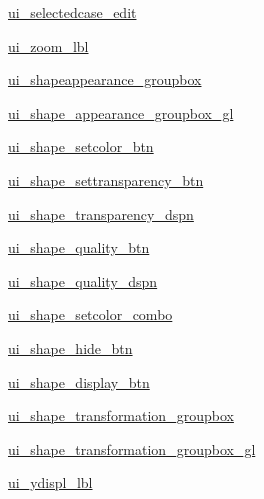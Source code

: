 \begin{DoxyCompactItemize}
\item 
\hyperlink{classoutput__viewer_u_i_1_1_ui___main_window_a0b802c9e05ee17be9d7fd6a867b2aa0f}{ui\+\_\+selectedcase\+\_\+edit}
\item 
\hyperlink{classoutput__viewer_u_i_1_1_ui___main_window_ab3983cab5036a720f91ae2ae62374f73}{ui\+\_\+zoom\+\_\+lbl}
\item 
\hyperlink{classoutput__viewer_u_i_1_1_ui___main_window_aa660273332cc5da8d46ae6e465323eda}{ui\+\_\+shapeappearance\+\_\+groupbox}
\item 
\hyperlink{classoutput__viewer_u_i_1_1_ui___main_window_a04a31fbb2f456070dfd32b6f122923b6}{ui\+\_\+shape\+\_\+appearance\+\_\+groupbox\+\_\+gl}
\item 
\hyperlink{classoutput__viewer_u_i_1_1_ui___main_window_a2b9029cd44541c9b09508f9cddbbffd7}{ui\+\_\+shape\+\_\+setcolor\+\_\+btn}
\item 
\hyperlink{classoutput__viewer_u_i_1_1_ui___main_window_a29e4e3e1bc1a96b5b5970f03ccdc3258}{ui\+\_\+shape\+\_\+settransparency\+\_\+btn}
\item 
\hyperlink{classoutput__viewer_u_i_1_1_ui___main_window_a0ad9bf35073cf45204d5ddca0156df53}{ui\+\_\+shape\+\_\+transparency\+\_\+dspn}
\item 
\hyperlink{classoutput__viewer_u_i_1_1_ui___main_window_a4ee4bf54cb958bebdc43e8598dcdd459}{ui\+\_\+shape\+\_\+quality\+\_\+btn}
\item 
\hyperlink{classoutput__viewer_u_i_1_1_ui___main_window_a091706f3093b19dadcf896b4fc354dc1}{ui\+\_\+shape\+\_\+quality\+\_\+dspn}
\item 
\hyperlink{classoutput__viewer_u_i_1_1_ui___main_window_a6412380402adf28d010e459b538c97be}{ui\+\_\+shape\+\_\+setcolor\+\_\+combo}
\item 
\hyperlink{classoutput__viewer_u_i_1_1_ui___main_window_af27038ec976b97c8007f5914afb2f4ed}{ui\+\_\+shape\+\_\+hide\+\_\+btn}
\item 
\hyperlink{classoutput__viewer_u_i_1_1_ui___main_window_ae8028f5880df8b13414eba6f474a3aee}{ui\+\_\+shape\+\_\+display\+\_\+btn}
\item 
\hyperlink{classoutput__viewer_u_i_1_1_ui___main_window_a1fc23acd26cd3067a21b1814e61be00e}{ui\+\_\+shape\+\_\+transformation\+\_\+groupbox}
\item 
\hyperlink{classoutput__viewer_u_i_1_1_ui___main_window_aebd41dcf93d9fad7a4dca658b1889a44}{ui\+\_\+shape\+\_\+transformation\+\_\+groupbox\+\_\+gl}
\item 
\hyperlink{classoutput__viewer_u_i_1_1_ui___main_window_a692312c2b09073353e2bfb7432092583}{ui\+\_\+ydispl\+\_\+lbl}

\end{DoxyCompactItemize}
